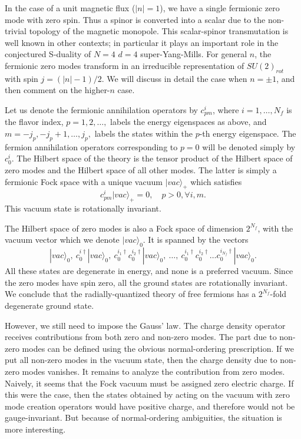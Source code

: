 \documentclass[a4paper,12pt, amsfonts, amssymb]{article}
\begin{document}
In the case of a unit magnetic flux ($|n|=1$), we have a single fermionic
zero mode with zero spin. Thus a spinor is converted into a scalar
due to the non-trivial topology of the magnetic monopole. This 
scalar-spinor transmutation is well known in other contexts;
in particular it plays an important role in the conjectured S-duality
of $N=4$ $d=4$ super-Yang-Mills. For general $n$, the fermionic zero
modes transform in an irreducible representation of $SU(2)_{rot}$ with spin
$j=(|n|-1)/2.$ We will discuss in detail the case when $n=\pm 1$, 
and then comment on the higher-$n$ case.

Let us denote the fermionic
annihilation operators by $c^i_{pm}$, where $i=1,\ldots,N_f$ is the
flavor index, $p=1,2,\ldots,$ labels the energy eigenspaces as above,
and $m=-j_p,-j_p+1,\ldots,j_p,$ labels the states within the $p$-th
energy eigenspace. The fermion annihilation operators corresponding to
$p=0$ will be denoted simply by $c^i_0.$
The Hilbert space of the theory is the tensor product of the Hilbert
space of zero modes and the Hilbert space of all other modes.
The latter is simply a fermionic Fock space with a unique vacuum
$|vac\rangle_+$ which satisfies
$$
c^i_{pm}|vac\rangle_+=0,\quad p>0,\forall i,m.
$$
This vacuum state is rotationally invariant.

The Hilbert space of zero modes is also a Fock space of dimension
$2^{N_f}$, with the vacuum vector which we denote $|vac\rangle_0$.
It is spanned by the vectors
$$
|vac\rangle_0,\ c^{i\dagger}_{0}|vac\rangle_0,\ 
c^{i_1\dagger}_0 c^{i_2\dagger}_0|vac\rangle_0,\ 
\ldots,\ 
c^{i_1\dagger}_0 c^{i_2\dagger}_0\ldots c^{i_{N_f}\dagger}_0
|vac\rangle_0.
$$
All these states are degenerate in energy, and none is 
a preferred vacuum. Since the zero modes have spin zero, all the
ground states are rotationally invariant. 
We conclude that the radially-quantized theory of free fermions 
has a $2^{N_f}$-fold degenerate ground state.

However, we still need to impose the Gauss' law. The charge density
operator receives contributions from both zero and non-zero modes.
The part due to non-zero modes can be defined using the obvious
normal-ordering prescription.
If we put all non-zero modes in the vacuum state, then the
charge density due to non-zero modes vanishes. It remains to analyze the
contribution from zero modes. Naively, it seems that the Fock
vacuum must be assigned zero electric charge. If this were the case,
then the states obtained by acting on the vacuum with zero mode creation operators would have positive charge, and therefore would not be
gauge-invariant. But because of normal-ordering ambiguities, 
the situation is more interesting.
\end{document}
